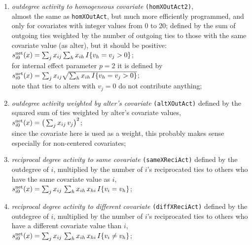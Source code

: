\documentclass[a4paper,fleqn,11pt]{article}
\newcommand{\+}{\, + \,}
\newcommand{\vit}{\theenumi}
\begin{document}
\begin{enumerate}
 \item {\em outdegree activity to homogeneous covariate}
\texttt{(homXOutAct2)},\\
 almost the same as \texttt{homXOutAct}, but much more efficiently programmed,
 and only for covariates with integer values from 0 to 20; defined by the
 sum of outgoing ties weighted by the number of outgoing
 ties to those with the same covariate value (as alter),
 but it should be positive:\\
 $s^{\rm net}_{i\vit}(x) = \sum_j x_{ij} \sum_h x_{ih} \,I\{v_h = v_j > 0\} $;\\[0.3em]
 for internal effect parameter $p=2$ it is defined by\\
 $s^{\rm net}_{i\vit}(x) = \sum_j x_{ij} \sqrt{\sum_h x_{ih} \,I\{v_h = v_j > 0\}} $;\\[0.3em]
 note that ties to alters with $v_j=0$ do not contribute anything;

 \item {\em outdegree activity weighted by alter's covariate}
  \texttt{(altXOutAct)} defined by the
 squared sum of ties weighted by alter's covariate values,\\
 $s^{\rm net}_{i\vit}(x) = \big(\sum_j x_{ij} \,v_j \big)^2 $;\\
 since the covariate here is used as a weight, this probably
 makes sense especially for non-centered covariates;


 \item {\em reciprocal degree activity to same covariate}
\texttt{(sameXReciAct)} defined by the outdegree of $i$,
 multiplied by the number of $i$'s reciprocated ties
 to others who have the same covariate value as $i$,\\
 $s^{\rm net}_{i\vit}(x) =  \sum_j x_{ij}\,
                \sum_h x_{ih}\,x_{hi}\, I\{v_i = v_h \} $;

 \item {\em reciprocal degree activity to different covariate}
\texttt{(diffXReciAct)} defined by the outdegree of $i$,
 multiplied by the number of $i$'s reciprocated ties
 to others who have a different covariate value than $i$,\\
 $s^{\rm net}_{i\vit}(x) =  \sum_j x_{ij}\,
                \sum_h x_{ih}\,x_{hi}\, I\{v_i \neq v_h \} $;



\end{enumerate}
\end{document}

